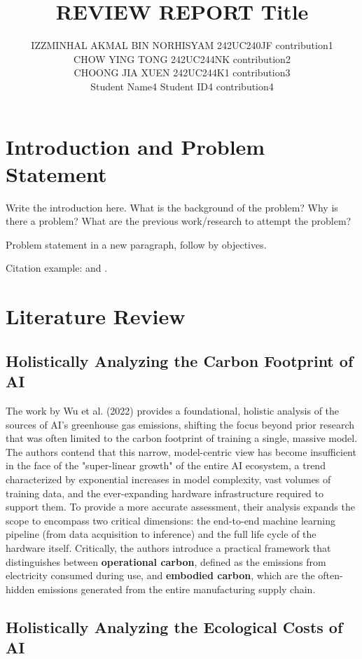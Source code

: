 \documentclass[a4paper, 12pt]{article}
\author{
IZZMINHAL AKMAL BIN NORHISYAM \quad 242UC240JF \quad contribution1 \\
CHOW YING TONG \quad 242UC244NK \quad contribution2\\
CHOONG JIA XUEN \quad 242UC244K1 \quad contribution3\\
Student Name4 \quad Student ID4 \quad contribution4\\
}
\title{ REVIEW REPORT  Title  }
\begin{document}
\maketitle


\section{Introduction and Problem Statement}
Write the introduction here. What is the background of the problem? Why is there a problem? What are the previous work/research to attempt the problem? 

Problem statement in a new paragraph, follow by objectives.

Citation example: \cite{Termenchy15} and \cite{Jones19}.

\section{Literature Review}
\subsection{Holistically Analyzing the Carbon Footprint of AI}
\hspace{24pt}The work by Wu et al. (2022) provides a foundational, holistic analysis of the sources of AI's greenhouse gas emissions, shifting the focus beyond prior research that was often limited to the carbon footprint of training a single, massive model. The authors contend that this narrow, model-centric view has become insufficient in the face of the "super-linear growth" of the entire AI ecosystem, a trend characterized by exponential increases in model complexity, vast volumes of training data, and the ever-expanding hardware infrastructure required to support them. To provide a more accurate assessment, their analysis expands the scope to encompass two critical dimensions: the end-to-end machine learning pipeline (from data acquisition to inference) and the full life cycle of the hardware itself. Critically, the authors introduce a practical framework that distinguishes between \textbf{operational carbon}, defined as the emissions from electricity consumed during use, and \textbf{embodied carbon}, which are the often-hidden emissions generated from the entire manufacturing supply chain.

\subsection{Holistically Analyzing the Ecological Costs of AI}
\end{document}
